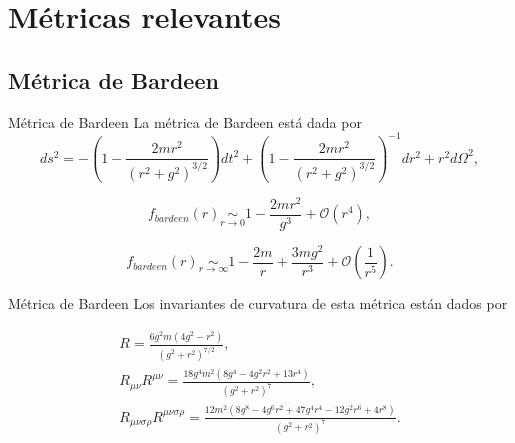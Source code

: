 \documentclass[t]{beamer}
\numberwithin{equation}{section}
\begin{document}
\section{\label{previous metrics section} Métricas relevantes}


\subsection{\label{bardeen section} Métrica de Bardeen}
\begin{frame}{Métrica de Bardeen}
\vspace{\fill}
La métrica de Bardeen está dada por \cite{bardeen}
\small
\begin{equation}
\label{bardeen metric}
ds^2 = -\left( 1 - \frac{2mr^2}{(r^2 + g^2)^{3/2}} \right)dt^2 + \left( 1 - \frac{2mr^2}{(r^2 + g^2)^{3/2}} \right)^{-1}dr^2 + r^2d\Omega^2,
\end{equation}

\normalsize
\begin{equation}
f_{bardeen}(r) \underset{r \to 0}{\sim} 1 - \frac{2mr^2}{g^3} + \mathcal{O}(r^4),
\end{equation}

\begin{equation}
f_{bardeen}(r) \underset{r \to \infty}{\sim} 1 - \frac{2m}{r} + \frac{3mg^2}{r^3} + \mathcal{O}\left( \frac{1}{r^5} \right).
\end{equation}
\vspace{\fill}
\end{frame}

\begin{frame}{Métrica de Bardeen}
Los invariantes de curvatura de esta métrica están dados por

\begin{equation}
\label{bardeen scalars}
\begin{gathered}
R = \frac{6 g^2 m \left(4 g^2-r^2\right)}{\left(g^2+r^2\right)^{7/2}},\\
R_{\mu \nu}R^{\mu \nu} = \frac{18 g^4 m^2 \left(8 g^4-4 g^2 r^2+13 r^4\right)}{\left(g^2+r^2\right)^7},\\
R_{\mu \nu \sigma \rho}R^{\mu \nu \sigma \rho} = \frac{12 m^2 \left(8 g^8-4 g^6 r^2+47 g^4 r^4-12 g^2 r^6+4 r^8\right)}{\left(g^2+r^2\right)^7}.
\end{gathered}
\end{equation}
\end{frame}
\end{document}
